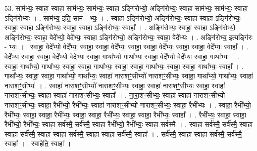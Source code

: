 \documentclass[17pt]{extarticle}
\begin{document}
53. साम॑भ्यः॒ स्वाहा॒ स्वाहा॒ साम॑भ्यः॒ साम॑भ्यः॒ स्वाहा ऽङ्गि॑रोभ्यो॒ अङ्गि॑रोभ्यः॒ स्वाहा॒ साम॑भ्यः॒ साम॑भ्यः॒ स्वाहा ऽङ्गि॑रोभ्यः । . साम॑भ्य॒ इति॒ साम॑ - भ्यः॒ । . स्वाहा ऽङ्गि॑रोभ्यो॒ अङ्गि॑रोभ्यः॒ स्वाहा॒ स्वाहा ऽङ्गि॑रोभ्यः॒ स्वाहा॒ स्वाहा ऽङ्गि॑रोभ्यः॒ स्वाहा॒ स्वाहा ऽङ्गि॑रोभ्यः॒ स्वाहा᳚ । . अङ्गि॑रोभ्यः॒ स्वाहा॒ स्वाहा ऽङ्गि॑रोभ्यो॒ अङ्गि॑रोभ्यः॒ स्वाहा॒ वेदे᳚भ्यो॒ वेदे᳚भ्यः॒ स्वाहा ऽङ्गि॑रोभ्यो॒ अङ्गि॑रोभ्यः॒ स्वाहा॒ वेदे᳚भ्यः । . अङ्गि॑रोभ्य॒ इत्यङ्गि॑रः - भ्यः॒ । . स्वाहा॒ वेदे᳚भ्यो॒ वेदे᳚भ्यः॒ स्वाहा॒ स्वाहा॒ वेदे᳚भ्यः॒ स्वाहा॒ स्वाहा॒ वेदे᳚भ्यः॒ स्वाहा॒ स्वाहा॒ वेदे᳚भ्यः॒ स्वाहा᳚ । . वेदे᳚भ्यः॒ स्वाहा॒ स्वाहा॒ वेदे᳚भ्यो॒ वेदे᳚भ्यः॒ स्वाहा॒ गाथा᳚भ्यो॒ गाथा᳚भ्यः॒ स्वाहा॒ वेदे᳚भ्यो॒ वेदे᳚भ्यः॒ स्वाहा॒ गाथा᳚भ्यः । . स्वाहा॒ गाथा᳚भ्यो॒ गाथा᳚भ्यः॒ स्वाहा॒ स्वाहा॒ गाथा᳚भ्यः॒ स्वाहा॒ स्वाहा॒ गाथा᳚भ्यः॒ स्वाहा॒ स्वाहा॒ गाथा᳚भ्यः॒ स्वाहा᳚ । . गाथा᳚भ्यः॒ स्वाहा॒ स्वाहा॒ गाथा᳚भ्यो॒ गाथा᳚भ्यः॒ स्वाहा॑ नाराशꣳ॒॒सीभ्यो॑ नाराशꣳ॒॒सीभ्यः॒ स्वाहा॒ गाथा᳚भ्यो॒ गाथा᳚भ्यः॒ स्वाहा॑ नाराशꣳ॒॒सीभ्यः॑ । . स्वाहा॑ नाराशꣳ॒॒सीभ्यो॑ नाराशꣳ॒॒सीभ्यः॒ स्वाहा॒ स्वाहा॑ नाराशꣳ॒॒सीभ्यः॒ स्वाहा॒ स्वाहा॑ नाराशꣳ॒॒सीभ्यः॒ स्वाहा॒ स्वाहा॑ नाराशꣳ॒॒सीभ्यः॒ स्वाहा᳚ । . ना॒रा॒शꣳ॒॒सीभ्यः॒ स्वाहा॒ स्वाहा॑ नाराशꣳ॒॒सीभ्यो॑ नाराशꣳ॒॒सीभ्यः॒ स्वाहा॒ रैभी᳚भ्यो॒ रैभी᳚भ्यः॒ स्वाहा॑ नाराशꣳ॒॒सीभ्यो॑ नाराशꣳ॒॒सीभ्यः॒ स्वाहा॒ रैभी᳚भ्यः । . स्वाहा॒ रैभी᳚भ्यो॒ रैभी᳚भ्यः॒ स्वाहा॒ स्वाहा॒ रैभी᳚भ्यः॒ स्वाहा॒ स्वाहा॒ रैभी᳚भ्यः॒ स्वाहा॒ स्वाहा॒ रैभी᳚भ्यः॒ स्वाहा᳚ । . रैभी᳚भ्यः॒ स्वाहा॒ स्वाहा॒ रैभी᳚भ्यो॒ रैभी᳚भ्यः॒ स्वाहा॒ सर्व॑स्मै॒ सर्व॑स्मै॒ स्वाहा॒ रैभी᳚भ्यो॒ रैभी᳚भ्यः॒ स्वाहा॒ सर्व॑स्मै । . स्वाहा॒ सर्व॑स्मै॒ सर्व॑स्मै॒ स्वाहा॒ स्वाहा॒ सर्व॑स्मै॒ स्वाहा॒ स्वाहा॒ सर्व॑स्मै॒ स्वाहा॒ स्वाहा॒ सर्व॑स्मै॒ स्वाहा᳚ । . सर्व॑स्मै॒ स्वाहा॒ स्वाहा॒ सर्व॑स्मै॒ सर्व॑स्मै॒ स्वाहा᳚ । . स्वाहेति॒ स्वाहा᳚ । \newline
\pagebreak
{}
\end{document}
